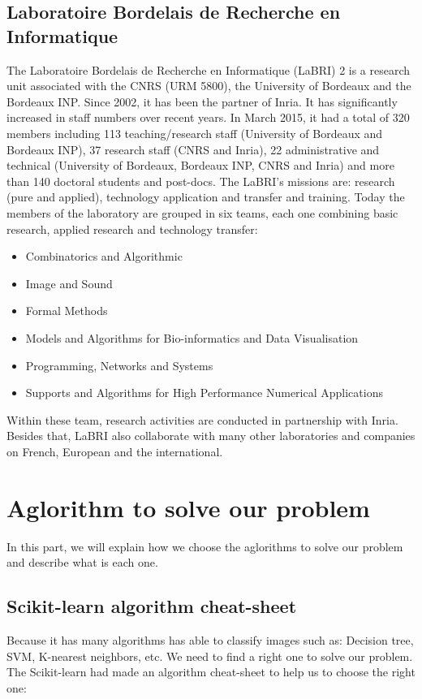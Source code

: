\documentclass[hidelinks,12pt,a4paper]{report}
\begin{document}
\section{Laboratoire Bordelais de Recherche en Informatique}
The Laboratoire Bordelais de Recherche en Informatique (LaBRI) 2 is a research unit associated with the CNRS (URM 5800), the University of Bordeaux and the Bordeaux INP. Since 2002, it has been the partner of Inria. It has significantly increased in staff numbers over recent years.
In March 2015, it had a total of 320 members including 113 teaching/research staff (University of Bordeaux and Bordeaux INP), 37 research staff (CNRS and Inria), 22 administrative and technical (University of Bordeaux, Bordeaux INP, CNRS and Inria) and more than 140 doctoral
students and post-docs. The LaBRI’s missions are: research (pure and applied), technology application and transfer and training.
Today the members of the laboratory are grouped in six teams, each one combining basic research, applied research and technology transfer:
\begin{itemize}
	\item Combinatorics and Algorithmic
	\item Image and Sound
	\item Formal Methods
	\item Models and Algorithms for Bio-informatics and Data Visualisation
	\item Programming, Networks and Systems
	\item Supports and Algorithms for High Performance Numerical Applications
\end{itemize}
Within these team, research activities are conducted in partnership with Inria. Besides that, LaBRI also collaborate with many other laboratories and companies on French, European and the international.

\chapter{Aglorithm to solve our problem}
In this part, we will explain how we choose the aglorithms to solve our problem and describe what is each one.
\section{Scikit-learn algorithm cheat-sheet\cite{scikitlearn.org}}
Because it has many algorithms has able to classify images such as: Decision tree\cite{j.r.quinlan1985}, SVM\cite{stever.gunn1998}, K-nearest neighbors\cite{orenanavakfiry.levy2017}, etc. We need to find a right one to solve our problem. The Scikit-learn had made an algorithm cheat-sheet to help us to choose the right one:
\end{document}
